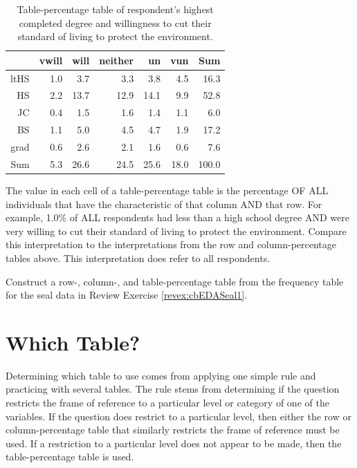 \documentclass[10pt,openany]{book}\usepackage[]{graphicx}\usepackage[]{color}
\begin{document}
\begin{table}[ht]
\centering
\caption{Table-percentage table of respondent's highest completed degree and willingness to cut their standard of living to protect the environment.} 
\label{tab:EnvTblP}
\begin{tabular}{rrrrrrr}
  \hline
 & vwill & will & neither & un & vun & Sum \\ 
  \hline
ltHS & 1.0 & 3.7 & 3.3 & 3.8 & 4.5 & 16.3 \\ 
  HS & 2.2 & 13.7 & 12.9 & 14.1 & 9.9 & 52.8 \\ 
  JC & 0.4 & 1.5 & 1.6 & 1.4 & 1.1 & 6.0 \\ 
  BS & 1.1 & 5.0 & 4.5 & 4.7 & 1.9 & 17.2 \\ 
  grad & 0.6 & 2.6 & 2.1 & 1.6 & 0.6 & 7.6 \\ 
  Sum & 5.3 & 26.6 & 24.5 & 25.6 & 18.0 & 100.0 \\ 
   \hline
\end{tabular}
\end{table}


The value in each cell of a table-percentage table is the percentage OF ALL individuals that have the characteristic of that column AND that row.  For example, 1.0\% of ALL respondents had less than a high school degree AND were very willing to cut their standard of living to protect the environment.  Compare this interpretation to the interpretations from the row and column-percentage tables above.  This interpretation does refer to all respondents.


\vspace{-12pt}

\begin{exsection}
  \item \label{revex:cbEDASeal2} Construct a row-, column-, and table-percentage table from the frequency table for the seal data in Review Exercise \ref{revex:cbEDASeal1}. 
\end{exsection}


\section{Which Table?}
Determining which table to use comes from applying one simple rule and practicing with several tables.  The rule stems from determining if the question restricts the frame of reference to a particular level or category of one of the variables.  If the question does restrict to a particular level, then either the row or column-percentage table that similarly restricts the frame of reference must be used.  If a restriction to a particular level does not appear to be made, then the table-percentage table is used.
\end{document}
